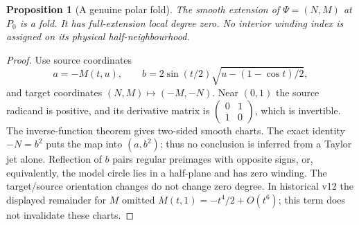 \documentclass[11pt]{article}
\theoremstyle{readable}
\newtheorem{proposition}[theorem]{Proposition}
\theoremstyle{remark}\newtheorem{remark}[theorem]{Remark}
\begin{document}
\begin{proposition}[A genuine polar fold]\label{prop:polar}
The smooth extension of $\Psi=(N,M)$ at $P_0$ is a fold. It has full-extension
local degree zero. No interior winding index is assigned on its physical
half-neighbourhood.
\end{proposition}
\begin{proof}
Use source coordinates
\[
 a=-M(t,u),\qquad b=2\sin(t/2)\sqrt{u-(1-\cos t)/2},
\]
and target coordinates $(N,M)\mapsto(-M,-N)$. Near $(0,1)$ the source
radicand is positive, and its derivative matrix is
$\left(\begin{smallmatrix}0&1\\1&0\end{smallmatrix}\right)$, which is
invertible. The inverse-function theorem gives two-sided smooth charts.
The exact identity $-N=b^2$ puts the map into $(a,b^2)$; thus no conclusion
is inferred from a Taylor jet alone. Reflection of $b$ pairs regular
preimages with opposite signs, or, equivalently, the model circle lies in a
half-plane and has zero winding. The target/source orientation changes do
not change zero degree. In historical v12 the displayed remainder for $M$
omitted $M(t,1)=-t^4/2+O(t^6)$; this term does not invalidate these charts.
\end{proof}
\end{document}
